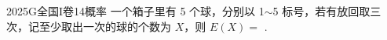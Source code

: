 
\begin{problem}{2025}{G}{全国I卷}{14}{概率}
一个箱子里有 5 个球，分别以 1$\sim$5 标号，若有放回取三次，记至少取出一次的球的个数为 $X$，则 $E(X)=$ \underline{\hspace{4em}}.
\end{problem}